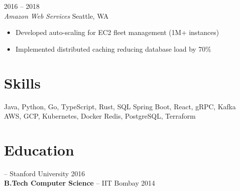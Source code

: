 \documentclass[10pt,letterpaper]{article}
\begin{document}
\vspace{6pt}
 \hfill {\small\color{mid} 2016 -- 2018}\\
{\color{accent}\textit{Amazon Web Services}} \hfill {\small\color{mid} Seattle, WA}
\begin{itemize}[leftmargin=1.2em, label={\textcolor{accent}{}}, topsep=2pt, itemsep=1pt]
  \item Developed auto-scaling for EC2 fleet management (1M+ instances)
  \item Implemented distributed caching reducing database load by 70\%
\end{itemize}

\section{ \enspace Skills}

{\small
\textcolor{accent}{} \enspace Java, Python, Go, TypeScript, Rust, SQL \quad
\textcolor{accent}{} \enspace Spring Boot, React, gRPC, Kafka \\[4pt]
\textcolor{accent}{} \enspace AWS, GCP, Kubernetes, Docker \quad
\textcolor{accent}{} \enspace Redis, PostgreSQL, Terraform
}

\section{ \enspace Education}

 -- Stanford University \hfill {\small 2016}\\
{\bfseries B.Tech Computer Science} -- IIT Bombay \hfill {\small 2014}
\end{document}
